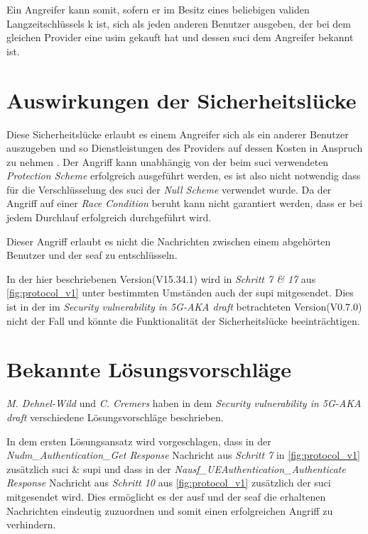 Ein Angreifer kann somit, sofern er im Besitz eines beliebigen validen Langzeitschlüssels \gls{k} ist, sich als jeden anderen Benutzer ausgeben, der bei dem gleichen Provider eine \gls{usim} gekauft hat und dessen \gls{suci} dem Angreifer bekannt ist.


\newpage
\section{Auswirkungen der Sicherheitslücke}

Diese Sicherheitslücke erlaubt es einem Angreifer sich als ein anderer Benutzer auszugeben und so Dienstleistungen des Providers auf dessen Kosten in Anspruch zu nehmen \cite{vulnerability}.
Der Angriff kann unabhängig von der beim \gls{suci} verwendeten \textit{Protection Scheme} erfolgreich ausgeführt werden, es ist also nicht notwendig dass für die Verschlüsselung des \gls{suci} der \textit{Null Scheme} verwendet wurde.
Da der Angriff auf einer \textit{Race Condition} beruht kann nicht garantiert werden, dass er bei jedem Durchlauf erfolgreich durchgeführt wird.

Dieser Angriff erlaubt es nicht die Nachrichten zwischen einem abgehörten Benutzer und der \gls{seaf} zu entschlüsseln.

In der hier beschriebenen Version(V15.34.1) wird in \textit{Schritt 7 \& 17} aus \cref{fig:protocol_v1} unter bestimmten Umständen auch der \gls{supi} mitgesendet.
Dies ist in der im \textit{Security vulnerability in 5G-AKA draft} betrachteten Version(V0.7.0) nicht der Fall und könnte die Funktionalität der Sicherheitslücke beeinträchtigen.


\section{Bekannte Lösungsvorschläge}

\textit{M. Dehnel-Wild} und \textit{C. Cremers} haben in dem \textit{Security vulnerability in 5G-AKA draft} \cite{vulnerability} verschiedene Lösungsvorschläge beschrieben.

In dem ersten Lösungsansatz wird vorgeschlagen, dass in der \textit{Nudm\_Authentication\_Get Response} Nachricht aus \textit{Schritt 7} in \cref{fig:protocol_v1} zusätzlich \gls{suci} \& \gls{supi} und dass in der \textit{Nausf\_UEAuthentication\_Authenticate Response} Nachricht aus \textit{Schritt 10} aus \cref{fig:protocol_v1} zusätzlich der \gls{suci} mitgesendet wird.
Dies ermöglicht es der \gls{ausf} und der \gls{seaf} die erhaltenen Nachrichten eindeutig zuzuordnen und somit einen erfolgreichen Angriff zu verhindern.

